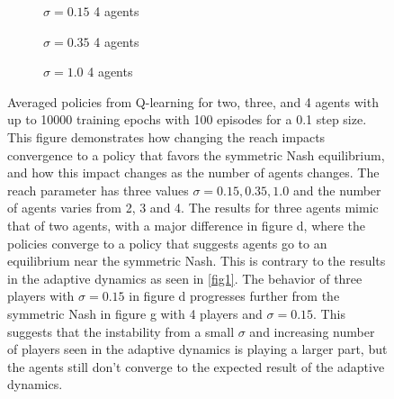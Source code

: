 \documentclass{article}
\begin{document}
\begin{figure}[ht!]
    
                        \begin{subfigure}[b]{0.3\linewidth}
                            \centering
                            
                            \caption{$\sigma=0.15$ 4 agents}  
                            \label{fig14:g} 
                            \vspace{4ex}
                        \end{subfigure}
                        \begin{subfigure}[b]{0.3\linewidth}
                            \centering
                            
                            \caption{$\sigma=0.35$ 4 agents} 
                            \label{fig14:h} 
                            \vspace{4ex}
                        \end{subfigure}
                        \begin{subfigure}[b]{0.3\linewidth}
                            \centering
                             
                            \caption{$\sigma=1.0$ 4 agents} 
                            \label{fig14:i}
                            \vspace{4ex}
                        \end{subfigure} 
                        
                        \caption{Averaged policies from Q-learning for two, three, and 4 agents with up to 10000 training epochs with 100 episodes for a 0.1 step size. This figure demonstrates how changing the reach impacts convergence to a policy that favors the symmetric Nash equilibrium, and how this impact changes as the number of agents changes. The reach parameter has three values $\sigma=0.15,0.35,1.0$ and the number of agents varies from 2, 3 and 4. The results for three agents mimic that of two agents, with a major difference in figure d, where the policies converge to a policy that suggests agents go to an equilibrium near the symmetric Nash. This is contrary to the results in the adaptive dynamics as seen in \cref{fig1}. The behavior of three players with $\sigma=0.15$ in figure d progresses further from the symmetric Nash in figure g with 4 players and $\sigma=0.15$. This suggests that the instability from a small $\sigma$ and increasing number of players seen in the adaptive dynamics is playing a larger part, but the agents still don't converge to the expected result of the adaptive dynamics.}
                        \label{fig14} 
                \end{figure}
\end{document}
